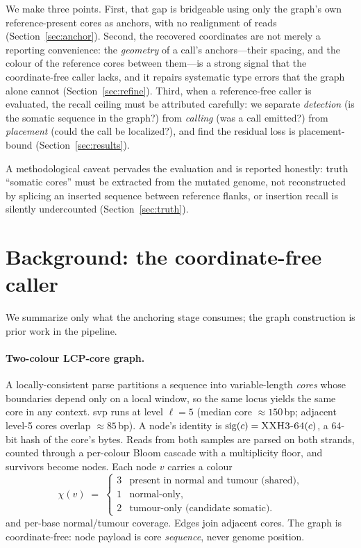 \documentclass[11pt]{article}
\newcommand{\sig}{\operatorname{sig}}
\newcommand{\colour}{\chi}
\newcommand{\XXH}{\textsc{XXH3-64}}
\begin{document}
We make three points. First, that gap is bridgeable using only the graph's own
reference-present cores as anchors, with no realignment of reads (Section~\ref{sec:anchor}).
Second, the recovered coordinates are not merely a reporting convenience: the \emph{geometry} of
a call's anchors---their spacing, and the colour of the reference cores between them---is a strong
signal that the coordinate-free caller lacks, and it repairs systematic type errors that the
graph alone cannot (Section~\ref{sec:refine}). Third, when a reference-free caller is evaluated,
the recall ceiling must be attributed carefully: we separate \emph{detection} (is the somatic
sequence in the graph?) from \emph{calling} (was a call emitted?) from \emph{placement} (could the
call be localized?), and find the residual loss is placement-bound (Section~\ref{sec:results}).

A methodological caveat pervades the evaluation and is reported honestly: truth ``somatic cores''
must be extracted from the mutated genome, not reconstructed by splicing an inserted sequence
between reference flanks, or insertion recall is silently undercounted (Section~\ref{sec:truth}).

\section{Background: the coordinate-free caller}
\label{sec:bg}

We summarize only what the anchoring stage consumes; the graph construction is prior work in the
pipeline.

\paragraph{Two-colour LCP-core graph.}
A locally-consistent parse partitions a sequence into variable-length \emph{cores} whose
boundaries depend only on a local window, so the same locus yields the same core in any context.
svp runs at level $\ell = 5$ (median core $\approx 150$\,bp; adjacent level-5 cores overlap
$\approx 85$\,bp). A node's identity is $\sig(c) = \XXH(c)$, a 64-bit hash of the core's bytes.
Reads from both samples are parsed on both strands, counted through a per-colour Bloom cascade
with a multiplicity floor, and survivors become nodes. Each node $v$ carries a colour
\begin{equation}
\colour(v) \;=\;
\begin{cases}
3 & \text{present in normal and tumour (shared),}\\
1 & \text{normal-only,}\\
2 & \text{tumour-only (candidate somatic).}
\end{cases}
\end{equation}
and per-base normal/tumour coverage. Edges join adjacent cores. The graph is coordinate-free:
node payload is core \emph{sequence}, never genome position.
\end{document}
